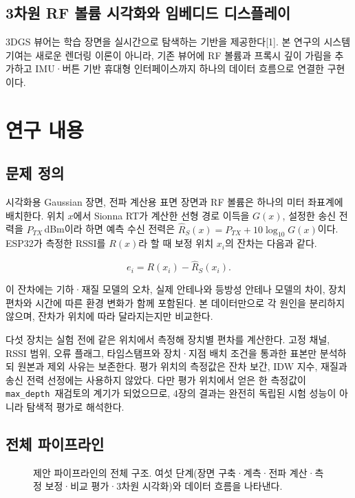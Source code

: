 \documentclass[11pt,a4paper]{article}
\newcommand{\figplaceholder}[2][0.86\textwidth]{%
  \fbox{\begin{minipage}[c][#2][c]{#1}\centering\small\color{gray}
  [그림 삽입 예정]\end{minipage}}}
\newcommand{\md}{\texttt{max\_depth}}
\begin{document}
\subsection{3차원 RF 볼륨 시각화와 임베디드 디스플레이}

3DGS 뷰어는 학습 장면을 실시간으로 탐색하는 기반을 제공한다[1]. 본 연구의 시스템 기여는 새로운 렌더링
이론이 아니라, 기존 뷰어에 RF 볼륨과 프록시 깊이 가림을 추가하고 IMU·버튼 기반 휴대형 인터페이스까지
하나의 데이터 흐름으로 연결한 구현이다.

\section{연구 내용}

\subsection{문제 정의}

시각화용 Gaussian 장면, 전파 계산용 표면 장면과 RF 볼륨은 하나의 미터 좌표계에 배치한다. 위치 $x$에서
Sionna RT가 계산한 선형 경로 이득을 $G(x)$, 설정한 송신 전력을 $P_{TX}$\,dBm이라 하면 예측 수신
전력은 $\hat{R}_S(x)=P_{TX}+10\log_{10}G(x)$이다. ESP32가 측정한 RSSI를 $R(x)$라 할 때 보정
위치 $x_i$의 잔차는 다음과 같다.

\begin{equation}
  e_i = R(x_i) - \hat{R}_S(x_i).
\end{equation}

이 잔차에는 기하·재질 모델의 오차, 실제 안테나와 등방성 안테나 모델의 차이, 장치 편차와 시간에 따른 환경
변화가 함께 포함된다. 본 데이터만으로 각 원인을 분리하지 않으며, 잔차가 위치에 따라 달라지는지만
비교한다.

다섯 장치는 실험 전에 같은 위치에서 측정해 장치별 편차를 계산한다. 고정 채널, RSSI 범위, 오류 플래그,
타임스탬프와 장치·지점 배치 조건을 통과한 표본만 분석하되 원본과 제외 사유는 보존한다. 평가 위치의
측정값은 잔차 보간, IDW 지수, 재질과 송신 전력 선정에는 사용하지 않았다. 다만 평가 위치에서 얻은 한
측정값이 \md\ 재검토의 계기가 되었으므로, 4장의 결과는 완전히 독립된 시험 성능이 아니라 탐색적 평가로
해석한다.

\subsection{전체 파이프라인}

\begin{figure}[htbp]
  \centering
  \figplaceholder{4.2cm}
  \caption{제안 파이프라인의 전체 구조. 여섯 단계(장면 구축·계측·전파 계산·측정 보정·비교 평가·3차원
           시각화)와 데이터 흐름을 나타낸다.}
  \label{fig:pipeline}
\end{figure}
\end{document}
